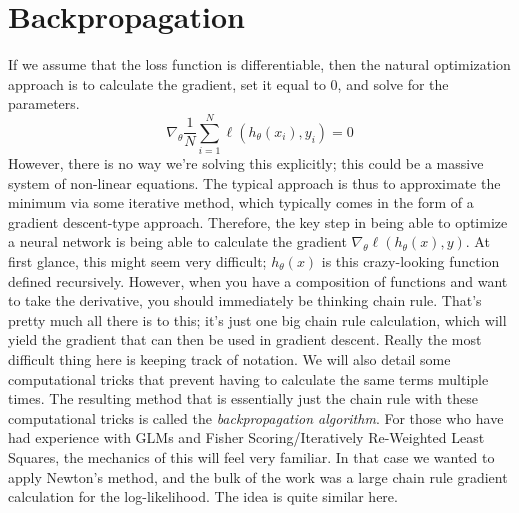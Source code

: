 \documentclass[12pt]{article}
\begin{document}
\section{Backpropagation}
If we assume that the loss function is differentiable, then the natural optimization approach is to calculate the gradient, set it equal to $0$, and solve for the parameters. 
\[\nabla_\theta \frac{1}{N} \sum_{i = 1}^{N} \ell(h_\theta(x_i), y_i) = 0\]
However, there is no way we're solving this explicitly; this could be a massive system of non-linear equations. The typical approach is thus to approximate the minimum via 
some iterative method, which typically comes in the form of a gradient descent-type approach. Therefore, the key step in being able to optimize a neural network is being able 
to calculate the gradient $\nabla_\theta \ell(h_\theta(x), y)$. At first glance, this might seem very difficult; $h_\theta(x)$ is this crazy-looking function defined recursively. However, 
when you have a composition of functions and want to take the derivative, you should immediately be thinking chain rule. That's pretty much all there is to this; it's just one big
chain rule calculation, which will yield the gradient that can then be used in gradient descent. Really the most difficult thing here is keeping track of notation. We will also 
detail some computational tricks that prevent having to calculate the same terms multiple times. The resulting method that is essentially just the chain rule with these computational 
tricks is called the \textit{backpropagation algorithm}. For those who have had experience with GLMs and Fisher Scoring/Iteratively Re-Weighted Least Squares, the mechanics of this 
will feel very familiar. In that case we wanted to apply Newton's method, and the bulk of the work was a large chain rule gradient calculation for the log-likelihood. The idea is quite similar
here. 
\end{document}

